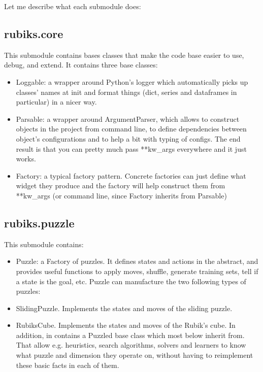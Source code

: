 Let me describe what each submodule does:

\subsection{rubiks.core}
This submodule contains bases classes that make the code base easier to use, debug, and extend. It contains three base classes:
\begin{itemize}
\item Loggable: a wrapper around Python's logger which automatically picks up classes' names at init and format things (dict, series and dataframes in particular) in a nicer way.
\item Parsable: a wrapper around ArgumentParser, which allows to construct objects in the project from command line, to define dependencies between object's configurations and to help a bit with typing of configs. The end result is that you can pretty much pass **kw\_args everywhere and it just works.
\item Factory: a typical factory pattern. Concrete factories can just define what widget they produce and the factory will help construct them from **kw\_args (or command line, since Factory inherits from Parsable)
\end{itemize}

\subsection{rubiks.puzzle}
This submodule contains:
\begin{itemize}
\item Puzzle: a Factory of puzzles. It defines states and actions in the abstract, and provides useful functions to apply moves, shuffle, generate training sets, tell if a state is the goal, etc. Puzzle can manufacture the two following types of puzzles:
\item SlidingPuzzle. Implements the states and moves of the sliding puzzle.
\item RubiksCube. Implements the states and moves of the Rubik's cube.
In addition, in contains a Puzzled base class which most below inherit from. That allow e.g. heuristics, search algorithms, solvers and learners to know what puzzle and dimension they operate on, without having to reimplement these basic facts in each of them.
\end{itemize}

